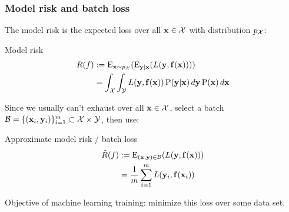 \begin{frame}
    \frametitle{Model risk and batch loss}

    The \alert{model risk} is the expected loss over all $\mathbf{x} \in \mathcal{X}$ with distribution $p_{\mathcal{X}}$:

    \begin{block}{Model risk}
        \vspace{-1em}
        \begin{align*}
            R(f) &:= \operatorname{\mathrm{E}}_{\mathbf{x} \sim p_{\mathcal{X}}}(\operatorname{\mathrm{E}}_{\mathbf{y} \mid \mathbf{x}}(L(\mathbf{y}, \mathbf{f}(\mathbf{x})))) \\
            &= \int_{\mathcal{X}} \int_{\mathcal{Y}} L(\mathbf{y}, \mathbf{f}(\mathbf{x})) \operatorname{\mathrm{P}}(\mathbf{y} | \mathbf{x}) \, d\mathbf{y} \operatorname{\mathrm{P}}(\mathbf{x}) \, d\mathbf{x}
        \end{align*}
    \end{block}
    \pause

    Since we usually can't exhaust over all $\mathbf{x} \in \mathcal{X}$, select a batch $\mathcal{B} = \{(\mathbf{x}_i, \mathbf{y}_i)\}_{i=1}^m \subset \mathcal{X} \times \mathcal{Y}$, then use:

    \begin{block}{Approximate model risk / batch loss}
        \vspace{-1em}
        \begin{align*}
            \hat{R}(f) &:= \operatorname{\mathrm{E}}_{(\mathbf{x}, \mathbf{y}) \in \mathcal{B}}(L(\mathbf{y}, \mathbf{f}(\mathbf{x}))) \\
            &= \frac{1}{m} \sum_{i=1}^m L(\mathbf{y}_i, \mathbf{f}(\mathbf{x}_i))
        \end{align*}
    \end{block}
    \pause

    Objective of machine learning training: \alert{minimize this loss over some data set}.
\end{frame}

